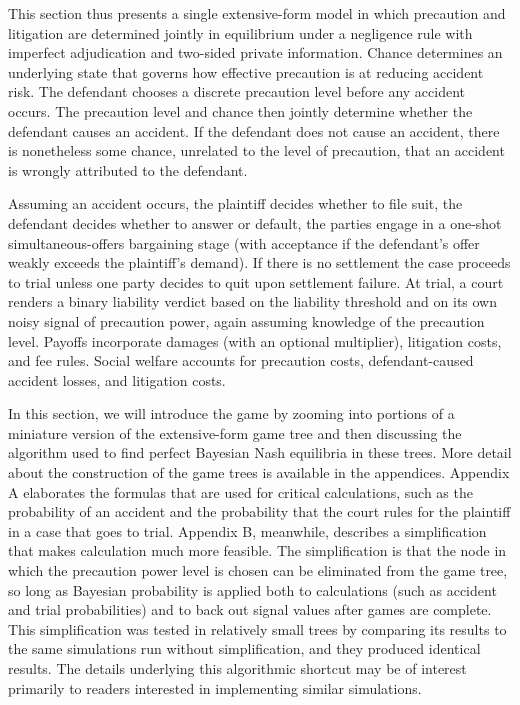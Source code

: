 \documentclass{article}
\begin{document}
This section thus presents a single extensive-form model in which precaution and litigation are determined jointly in equilibrium under a negligence rule with imperfect adjudication and two-sided private information. Chance determines an underlying state that governs how effective precaution is at reducing accident risk. The defendant chooses a discrete precaution level before any accident occurs. The precaution level and chance then jointly determine whether the defendant causes an accident. If the defendant does not cause an accident, there is nonetheless some chance, unrelated to the level of precaution, that an accident is wrongly attributed to the defendant. 

Assuming an accident occurs, the plaintiff decides whether to file suit, the defendant decides whether to answer or default, the parties engage in a one-shot simultaneous-offers bargaining stage (with acceptance if the defendant’s offer weakly exceeds the plaintiff’s demand). If there is no settlement the case proceeds to trial unless one party decides to quit upon settlement failure. At trial, a court renders a binary liability verdict based on the liability threshold and on its own noisy signal of precaution power, again assuming knowledge of the precaution level. Payoffs incorporate damages (with an optional multiplier), litigation costs, and fee rules. Social welfare accounts for precaution costs, defendant-caused accident losses, and litigation costs. 

In this section, we will introduce the game by zooming into portions of a miniature version of the extensive-form game tree and then discussing the algorithm used to find perfect Bayesian Nash equilibria in these trees. More detail about the construction of the game trees is available in the appendices. Appendix A elaborates the formulas that are used for critical calculations, such as the probability of an accident and the probability that the court rules for the plaintiff in a case that goes to trial. Appendix B, meanwhile, describes a simplification that makes calculation much more feasible. The simplification is that the node in which the precaution power level is chosen can be eliminated from the game tree, so long as Bayesian probability is applied both to calculations (such as accident and trial probabilities) and to back out signal values after games are complete. This simplification was tested in relatively small trees by comparing its results to the same simulations run without simplification, and they produced identical results. The details underlying this algorithmic shortcut may be of interest primarily to readers interested in implementing similar simulations.
\end{document}
